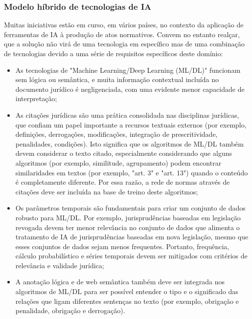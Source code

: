\subsubsection{Modelo híbrido de tecnologias de IA}

Muitas iniciativas estão em curso, em vários países, no contexto da aplicação de ferramentas de IA à produção de atos 
normativos. Convem no entanto realçar, que a solução não virá de uma tecnologia em específico mas de uma combinação de 
tecnologias devido a uma série de requisitos específicos deste domínio:

\begin{itemize}
    \item As tecnologias de "Machine Learning/Deep Learning (ML/DL)" funcionam sem lógica ou semântica, e muita informação 
    contextual incluída no documento jurídico é negligenciada, com uma evidente menor capacidade de interpretação;

    \item As citações jurídicas são uma prática consolidada nas disciplinas jurídicas, que confiam um papel importante a 
    recursos textuais externos (por exemplo, definições, derrogações, modificações, integração de prescritividade, penalidades, 
    condições). Isto significa que os algoritmos de ML/DL também devem considerar o texto citado, especialmente considerando 
    que alguns algoritmos (por exemplo, similitude, agrupamento) podem encontrar similaridades em textos 
    (por exemplo, "art. 3" e "art. 13") quando o conteúdo é completamente diferente. Por essa razão, a rede de normas através 
    de citações deve ser incluída na base de treino deste algoritmos;

    \item Os parâmetros temporais são fundamentais para criar um conjunto de dados robusto para ML/DL. 
    Por exemplo, jurisprudências baseadas em legislação revogada devem ter menor relevância no conjunto de dados que alimenta 
    o tratamento de IA de jurisprudências baseadas em nova legislação, mesmo que esses conjuntos de dados sejam menos frequentes. 
    Portanto, frequência, cálculo probabilístico e séries temporais devem ser mitigados com critérios de relevância e validade 
    jurídica;

    \item A anotação lógica e de web semântica também deve ser integrada nos algoritmos de ML/DL para ser possível 
    entender o tipo e o significado das relações que ligam diferentes sentenças no texto (por exemplo, obrigação e 
    penalidade, obrigação e derrogação).

\end{itemize}

